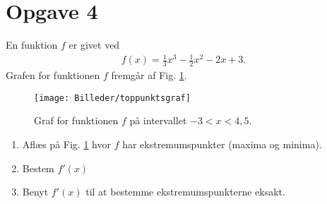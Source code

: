 \section*{Opgave 4}
En funktion $f$ er givet ved
\begin{align*}
f(x) = \frac{1}{3}x^3-\frac{1}{2}x^2-2x+3.
\end{align*}
Grafen for funktionen $f$ fremgår af Fig. \ref{fig:fgraf}.
\begin{figure}[H]
\texttt{[image: Billeder/toppunktsgraf]}
\caption{Graf for funktionen $f$ på intervallet $-3<x<4,5$.}
\label{fig:fgraf}
\end{figure}
\begin{enumerate}[label=\roman*)]
\item Aflæs på Fig. \ref{fig:fgraf} hvor $f$ har ekstremumspunkter (maxima og minima).
\item Bestem $f'(x)$
\item Benyt $f'(x)$ til at bestemme ekstremumspunkterne eksakt.
\end{enumerate}